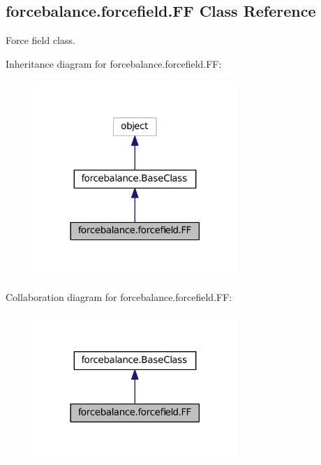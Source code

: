 \hypertarget{classforcebalance_1_1forcefield_1_1FF}{\subsection{forcebalance.\-forcefield.\-F\-F Class Reference}
\label{classforcebalance_1_1forcefield_1_1FF}
}


Force field class.  




Inheritance diagram for forcebalance.\-forcefield.\-F\-F\-:\nopagebreak
\begin{figure}[H]
\begin{center}
\leavevmode
\includegraphics[width=218pt]{classforcebalance_1_1forcefield_1_1FF__inherit__graph}
\end{center}
\end{figure}


Collaboration diagram for forcebalance.\-forcefield.\-F\-F\-:\nopagebreak
\begin{figure}[H]
\begin{center}
\leavevmode
\includegraphics[width=218pt]{classforcebalance_1_1forcefield_1_1FF__coll__graph}
\end{center}
\end{figure}
